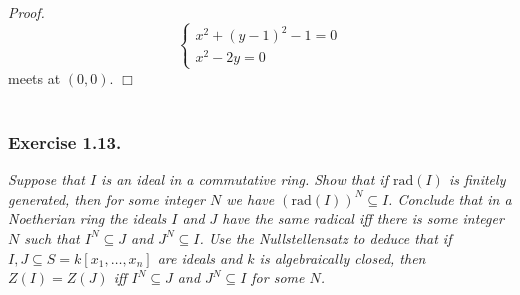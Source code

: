 \documentclass{article}
\begin{document}
\emph{Proof.}
\begin{equation*}
  \begin{cases}
    x^2 + (y-1)^2 - 1 = 0 \\
    x^2 - 2y = 0
  \end{cases}
\end{equation*}
meets at $(0,0)$.
$\Box$ \\\\






\subsubsection*{Exercise 1.13.}
\emph{Suppose that $I$ is an ideal in a commutative ring.
Show that if $\mathrm{rad}(I)$ is finitely generated,
then for some integer $N$ we have $(\mathrm{rad}(I))^N \subseteq I$.
Conclude that in a Noetherian ring the ideals $I$ and $J$ have the same radical
iff there is some integer $N$ such that $I^N \subseteq J$ and $J^N \subseteq I$.
Use the Nullstellensatz to deduce that if $I, J \subseteq S = k[x_1,\ldots,x_n]$
are ideals and $k$ is algebraically closed,
then $Z(I) = Z(J)$ iff $I^N \subseteq J$ and $J^N \subseteq I$ for some $N$.} \\
\end{document}
